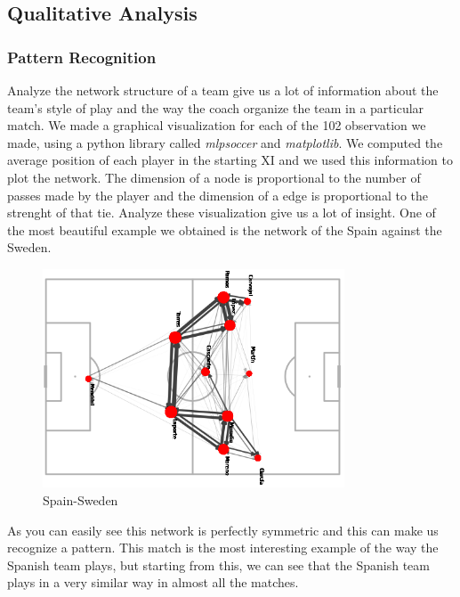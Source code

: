\documentclass[12pt, a4paper]{article}
\begin{document}
\subsection{Qualitative Analysis}
\label{qualitative-analysis}
\subsubsection{Pattern Recognition}
Analyze the network structure of a team give us a lot of information about the team's style of play and the way the coach organize the team in a particular match. We made a graphical visualization for each of the 102 observation we made, using a python library called \emph{mlpsoccer} and \emph{matplotlib}. We computed the average position of each player in the starting XI and we used this information to plot the network. The dimension of a node is proportional to the number of passes made by the player and the dimension of a edge is proportional to the strenght of that tie. Analyze these visualization give us a lot of insight. One of the most beautiful example we obtained is the network of the Spain against the Sweden. \\
\begin{figure}[H]
        \centering
        \includegraphics[width=0.8\textwidth]{../NoSubs/ImagesToRedo/Spain_Network_Spain_Sweden.png}
        \caption{Spain-Sweden}
        \label{fig: spain_sweden}
\end{figure}
As you can easily see this network is perfectly symmetric and this can make us recognize a pattern. This match is the most interesting example of the way the Spanish team plays, but starting from this, we can see that the Spanish team plays in a very similar way in almost all the matches. \\
\end{document}
